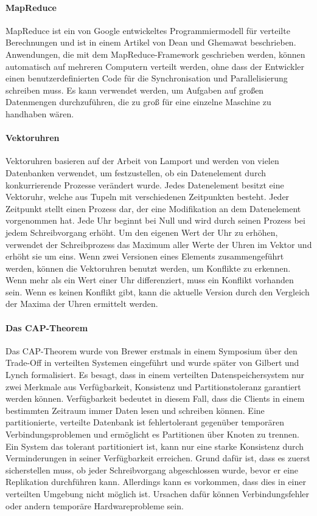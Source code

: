 \paragraph{MapReduce} MapReduce ist ein von Google entwickeltes Programmiermodell für verteilte Berechnungen und ist in einem Artikel von Dean und Ghemawat \cite{Dean:2008:MSD:1327452.1327492} beschrieben. Anwendungen, die mit dem MapReduce-Framework geschrieben werden, können automatisch auf mehreren Computern verteilt werden, ohne dass der Entwickler einen benutzerdefinierten Code für die Synchronisation und Parallelisierung schreiben muss. Es kann verwendet werden, um Aufgaben auf großen Datenmengen durchzuführen, die zu groß für eine einzelne Maschine zu handhaben wären.

\paragraph{Vektoruhren}
Vektoruhren  basieren auf der Arbeit von Lamport \cite{Lamport:1978:TCO:359545.359563} und werden von vielen Datenbanken verwendet, um festzustellen, ob ein Datenelement durch konkurrierende Prozesse verändert wurde. Jedes Datenelement besitzt eine Vektoruhr, welche aus Tupeln mit verschiedenen Zeitpunkten besteht. Jeder Zeitpunkt stellt einen Prozess dar, der eine Modifikation an dem Datenelement vorgenommen hat. Jede Uhr beginnt bei Null und wird durch seinen Prozess bei jedem Schreibvorgang erhöht. Um den eigenen Wert der Uhr zu erhöhen, verwendet der Schreibprozess das Maximum aller Werte der Uhren im Vektor und erhöht sie um eins. Wenn zwei Versionen eines Elements zusammengeführt werden, können die Vektoruhren benutzt werden, um Konflikte zu erkennen. Wenn mehr als ein Wert einer Uhr differenziert, muss ein Konflikt vorhanden sein. Wenn es keinen Konflikt gibt, kann die aktuelle Version durch den Vergleich der Maxima der Uhren ermittelt werden.

\paragraph{Das CAP-Theorem} Das CAP-Theorem wurde von Brewer erstmals in einem Symposium \cite{cap2010} über den Trade-Off in verteilten Systemen eingeführt und wurde später von Gilbert und Lynch \cite{Gilbert:2002:BCF:564585.564601} formalisiert. Es besagt, dass in einem verteilten Datenspeichersystem nur zwei Merkmale aus Verfügbarkeit, Konsistenz und  Partitionstoleranz garantiert werden können. Verfügbarkeit bedeutet in diesem Fall, dass die Clients in einem bestimmten Zeitraum immer Daten lesen und schreiben können. Eine partitionierte, verteilte Datenbank ist fehlertolerant gegenüber temporären Verbindungsproblemen und ermöglicht es Partitionen über Knoten zu trennen. Ein System das tolerant partitioniert ist, kann nur eine starke Konsistenz durch Verminderungen in seiner Verfügbarkeit erreichen. Grund dafür ist, dass es zuerst sicherstellen muss, ob jeder Schreibvorgang abgeschlossen wurde, bevor er eine Replikation durchführen kann. Allerdings kann es vorkommen, dass dies in einer verteilten Umgebung nicht möglich ist. Ursachen dafür können Verbindungsfehler oder andern temporäre Hardwareprobleme sein.

